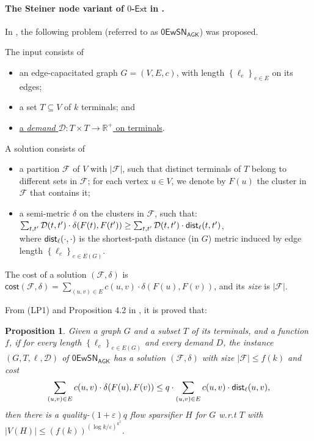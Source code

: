 \documentclass[11pt]{article}
\newtheorem{proposition}[theorem]{Proposition}
\theoremstyle{definition}
\newcommand{\set}[1]{\left\{ #1 \right\}}
\newcommand{\dset}{{\mathcal{D}}}
\newcommand{\fset}{{\mathcal{F}}}
\newcommand{\eps}{{\varepsilon}}
\newcommand{\dist}{\textnormal{\textsf{dist}}}
\newcommand\vol{\mathsf{cost}}
\newcounter{note}
\newcommand{\zesn}{\mathsf{0EwSN}}
\newcommand{\ze}{$0$-$\textsf{Ext}$\xspace}
\begin{document}
\begin{titlepage}
\paragraph{The Steiner node variant of \ze in \cite{andoni2014towards}.}
In \cite{andoni2014towards}, the following problem (referred to as $\zesn_{\textsf{AGK}}$) was proposed.

The input consists of
\begin{itemize}
\item an edge-capacitated graph $G=(V,E,c)$,  with length $\set{\ell_e}_{e\in E}$ on its edges;
\item a set $T\subseteq V$ of $k$ terminals; and
\item \underline{a \emph{demand} $\dset: T\times T\to \mathbb{R}^+$ on terminals}.
\end{itemize}
A solution consists of 
\begin{itemize}
	\item a partition $\fset$ of $V$ with $|\fset|$, such that distinct terminals of $T$ belong to different sets in $\fset$; for each vertex $u\in V$, we denote by $F(u)$ the cluster in $\fset$ that contains it;
	\item a semi-metric $\delta$ on the clusters in $\fset$, such that:\\ \underline{$\sum_{t,t'}\dset(t,t')\cdot\delta(F(t),F(t'))\ge \sum_{t,t'} \dset(t,t')\cdot\dist_{\ell}(t,t')$},\\
	where $\dist_{\ell}(\cdot,\cdot)$ is the shortest-path distance (in $G$) metric induced by edge length $\set{\ell_e}_{e\in E(G)}$.
\end{itemize}
The cost of a solution $(\fset,\delta)$ is $\vol(\fset,\delta)=\sum_{(u,v)\in E}c(u,v)\cdot\delta(F(u),F(v))$, and its \emph{size} is $|\fset|$.

From (LP1) and Proposition 4.2 in \cite{andoni2014towards}, it is proved that:
\begin{proposition}
Given a graph $G$ and a subset $T$ of its terminals, and a function $f$, if for every length $\set{\ell_e}_{e\in E(G)}$ and every demand $D$, the instance $(G,T,\ell,\dset)$ of $\zesn_{\textsf{AGK}}$ has a solution $(\fset,\delta)$ with size $|\fset|\le f(k)$ and cost 
\[\sum_{(u,v)\in E}c(u,v)\cdot\delta(F(u),F(v))\le q\cdot \sum_{(u,v)\in E}c(u,v)\cdot\dist_{\ell}(u,v),\] 
then there is a quality-$(1+\eps) q$ flow sparsifier $H$ for $G$ w.r.t $T$ with $|V(H)|\le (f(k))^{(\log k/\eps)^{k^2}}$.
\end{proposition}


\end{titlepage}
\end{document}

